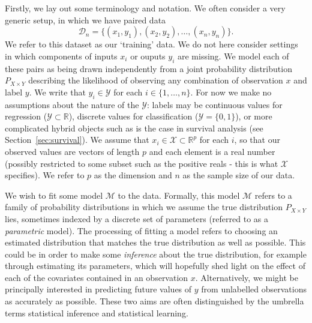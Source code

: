 \documentclass[thesis.tex]{subfiles}
\begin{document}
Firstly, we lay out some terminology and notation. We often consider a very generic setup, in which we have paired data
\[\mathcal{D}_n = \{(x_1, y_1), (x_2, y_2), \dots, (x_n, y_n)\}.\] 
We refer to this dataset as our `training' data. We do not here consider settings in which components of inputs $x_i$ or ouputs $y_i$ are missing. We model each of these pairs as being drawn independently from a joint probability distribution $P_{X \times Y}$ describing the likelihood of observing any combination of observation $x$ and label $y$. We write that $y_i \in \mathcal{Y}$ for each $i \in \{1,\dots, n\}$. For now we make no assumptions about the nature of the $\mathcal{Y}$: labels may be continuous values for regression ($\mathcal{Y} \subset \mathbb{R}$), discrete values for classification ($\mathcal{Y} = \{0,1\}$), or more complicated hybrid objects such as is the case in survival analysis (see Section~\ref{sec:survival}). We assume that $x_i \in \mathcal{X} \subset \mathbb{R}^p$ for each $i$, so that our observed values are vectors of length $p$ and each element is a real number (possibly restricted to some subset such as the positive reals - this is what $\mathcal{X}$ specifies). We refer to $p$ as the dimension and $n$ as the sample size of our data. 

We wish to fit some model $\mathcal{M}$ to the data. Formally, this model $\mathcal{M}$ refers to a family of probability distributions in which we assume the true distribution $P_{X \times Y}$ lies, sometimes indexed by a discrete set of parameters (referred to as a \emph{parametric} model). The processing of fitting a model refers to choosing an estimated distribution that matches the true distribution as well as possible. This could be in order to make some \emph{inference} about the true distribution, for example through estimating its parameters, which will hopefully shed light on the effect of each of the covariates contained in an observation $x$. Alternatively, we might be principally interested in predicting future values of $y$ from unlabelled observations as accurately as possible. These two aims are often distinguished by the umbrella terms statistical inference and statistical learning.
\end{document}

